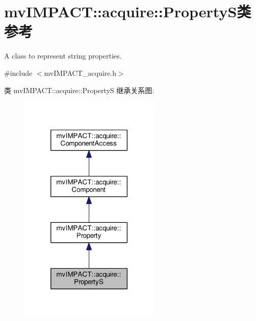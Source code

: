 \hypertarget{classmv_i_m_p_a_c_t_1_1acquire_1_1_property_s}{\section{mv\+I\+M\+P\+A\+C\+T\+:\+:acquire\+:\+:Property\+S类 参考}
\label{classmv_i_m_p_a_c_t_1_1acquire_1_1_property_s}
}


A class to represent string properties.  




{\ttfamily \#include $<$mv\+I\+M\+P\+A\+C\+T\+\_\+acquire.\+h$>$}



类 mv\+I\+M\+P\+A\+C\+T\+:\+:acquire\+:\+:Property\+S 继承关系图\+:
\nopagebreak
\begin{figure}[H]
\begin{center}
\leavevmode
\includegraphics[width=190pt]{classmv_i_m_p_a_c_t_1_1acquire_1_1_property_s__inherit__graph}
\end{center}
\end{figure}



